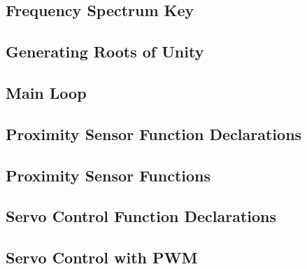 \documentclass[11pt]{article}           %
\begin{document}


\subsection{Frequency Spectrum Key}
\label{sub:frequency_spectrum_key}



\subsection{Generating Roots of Unity}
\label{sub:generating_roots_of_unity}



\subsection{Main Loop}
\label{sub:main_loop}



\subsection{Proximity Sensor Function Declarations}
\label{sub:proximity_sensor_function_declarations}



\subsection{Proximity Sensor Functions}
\label{sub:proximity_sensor_functions}



\subsection{Servo Control Function Declarations}
\label{sub:servo_control_function_declarations}



\subsection{Servo Control with PWM}
\label{sub:servo_control_with_pwm}


\end{document}
